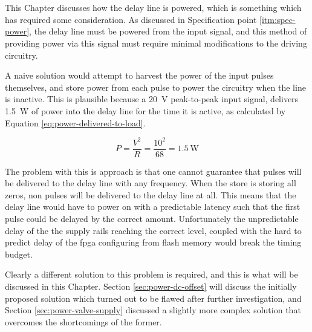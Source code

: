 \chapter{} \label{sec:power}

This Chapter discusses how the delay line is powered, which is something which has required some consideration. As discussed in Specification point \ref{itm:spec-power}, the delay line must be powered from the input signal, and this method of providing power via this signal must require minimal modifications to the driving circuitry.

A naive solution would attempt to harvest the power of the input pulses themselves, and store power from each pulse to power the circuitry when the line is inactive. This is plausible because a \SI{20}{\volt} peak-to-peak input signal, delivers \SI{1.5}{\watt} of power into the delay line for the time it is active, as calculated by Equation \ref{eq:power-delivered-to-load}.

\begin{equation}
P = \frac{V^2}{R} = \frac{10^2}{68} = \SI{1.5}{\watt} \label{eq:power-delivered-to-load}
\end{equation}

The problem with this is approach is that one cannot guarantee that pulses will be delivered to the delay line with any frequency. When the store is storing all zeros, non pulses will be delivered to the delay line at all. This means that the delay line would have to power on with a predictable latency such that the first pulse could be delayed by the correct amount. Unfortunately the unpredictable delay of the the supply rails reaching the correct level, coupled with the hard to predict delay of the \gls{fpga} configuring from flash memory would break the timing budget.

Clearly a different solution to this problem is required, and this is what will be discussed in this Chapter. Section \ref{sec:power-dc-offset} will discuss the initially proposed solution which turned out to be flawed after further investigation, and Section \ref{sec:power-valve-supply} discussed a slightly more complex solution that overcomes the shortcomings of the former.





